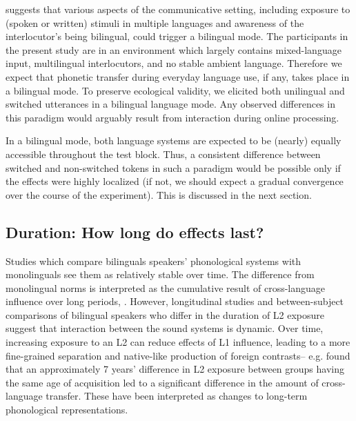 \documentclass[charis,linguex]{glossa}
\begin{document}
\cite{grosjean1998studying} suggests that various aspects of the communicative setting, including exposure to (spoken or written) stimuli in multiple languages and awareness of the interlocutor's being bilingual, could trigger a bilingual mode. The participants in the present study are in an environment which largely contains mixed-language input, multilingual interlocutors, and no stable ambient language. Therefore we expect that phonetic transfer during everyday language use, if any, takes place in a bilingual mode.  To preserve ecological validity, we elicited both unilingual and switched utterances in a bilingual language mode. Any observed differences in this paradigm would arguably result from interaction during online processing. 

In a bilingual mode, both language systems are expected to be (nearly) equally accessible throughout the test block. Thus, a consistent difference between switched and non-switched tokens in such a paradigm would be possible only if the effects were highly localized (if not, we should expect a gradual convergence over the course of the experiment). This is discussed in the next section.

\subsection{Duration: How long do effects last?} \label{duration}

Studies which compare bilinguals speakers' phonological systems with monolinguals see them as relatively stable over time. The difference from monolingual norms is interpreted as the cumulative result of cross-language influence over long periods, \cite{guion2003vowel, caramazza1973acquisition}. However, longitudinal studies %
and between-subject comparisons of bilingual speakers who differ in the duration of L2 exposure suggest that interaction between the sound systems is dynamic. Over time, increasing exposure to an L2 can reduce effects of L1 influence, leading to a more fine-grained separation and native-like production of foreign contrasts-- e.g. \cite{bohn1992production} 
found that an approximately 7 years' difference in L2 exposure between groups having the same age of acquisition led to a significant difference in the amount of cross-language transfer. These have been interpreted as changes to long-term phonological representations.
\end{document}
